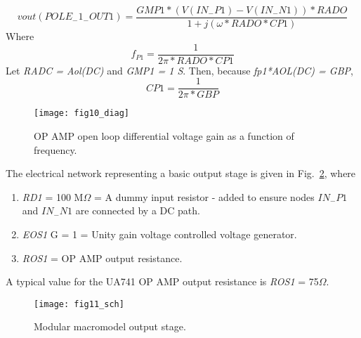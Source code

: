 \begin{equation}
vout(POLE_{-}1_{-}OUT1) = \dfrac{ GMP1 * ( V( IN _{-} P1 ) - V(IN _{-} N1) ) * RADO} { 1 + j (\omega * RADO * CP1 ) }
\end{equation}
Where \begin{equation}
        f_{P1} = \dfrac {1} {2\pi * RADO * CP1}
      \end{equation}
Let \textit{RADC = Aol(DC)} and \textit{GMP1 = 1 S}. Then, because \textit{fp1*AOL(DC) = GBP},
\begin{equation} 
CP1 = \dfrac{1} { 2\pi*GBP}
\end{equation}

\begin{figure}
  \centering
  \texttt{[image: fig10\_diag]}
  \caption{OP AMP open loop differential voltage gain as a function of frequency.}
  \label{fig:opamp10}
\end{figure}

\newpage 

The electrical network representing a basic output stage is given in Fig.~\ref{fig:opamp11}, where

\begin{enumerate}
\item \textit{ RD1}     = 100 M$\Omega$ = A dummy input resistor - added to ensure nodes $IN_{-}P1$ and $IN_{-}N1$ are connected by a DC path.
\item \textit{EOS1}   G = 1 = Unity gain voltage controlled voltage generator.
\item \textit{ROS1}     =  OP AMP output resistance.
\end{enumerate}

A typical value for the UA741 OP AMP output resistance is \textit{ROS1} =  75$\Omega$.


\begin{figure}
  \centering
  \texttt{[image: fig11\_sch]}
  \caption{Modular macromodel output stage.}
  \label{fig:opamp11}
\end{figure}

